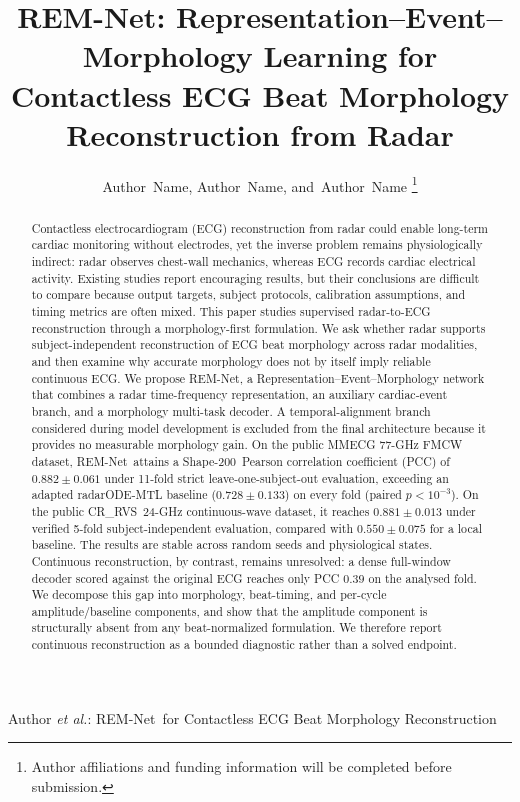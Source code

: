 \documentclass[lettersize,journal]{IEEEtran}
\newcommand{\remnet}{REM-Net\xspace}
\newcommand{\shape}{Shape-200\xspace}
\newcommand{\crrvs}{CR\_RVS\xspace}
\begin{document}
\title{\remnet: Representation--Event--Morphology Learning for Contactless ECG Beat Morphology Reconstruction from Radar}

\author{Author~Name,
        Author~Name,
        and~Author~Name%
\thanks{Author affiliations and funding information will be completed before submission.}
}

%
{Author \MakeLowercase{\textit{et al.}}: \remnet\ for Contactless ECG Beat Morphology Reconstruction}

\maketitle

\begin{abstract}
Contactless electrocardiogram (ECG) reconstruction from radar could enable long-term cardiac monitoring without electrodes, yet the inverse problem remains physiologically indirect: radar observes chest-wall mechanics, whereas ECG records cardiac electrical activity. Existing studies report encouraging results, but their conclusions are difficult to compare because output targets, subject protocols, calibration assumptions, and timing metrics are often mixed. This paper studies supervised radar-to-ECG reconstruction through a morphology-first formulation. We ask whether radar supports subject-independent reconstruction of ECG beat morphology across radar modalities, and then examine why accurate morphology does not by itself imply reliable continuous ECG. We propose \remnet, a Representation--Event--Morphology network that combines a radar time-frequency representation, an auxiliary cardiac-event branch, and a morphology multi-task decoder. A temporal-alignment branch considered during model development is excluded from the final architecture because it provides no measurable morphology gain. On the public MMECG 77-GHz FMCW dataset, \remnet\ attains a \shape\ Pearson correlation coefficient (PCC) of $0.882\pm0.061$ under 11-fold strict leave-one-subject-out evaluation, exceeding an adapted radarODE-MTL baseline ($0.728\pm0.133$) on every fold (paired $p<10^{-3}$). On the public \crrvs\ 24-GHz continuous-wave dataset, it reaches $0.881\pm0.013$ under verified 5-fold subject-independent evaluation, compared with $0.550\pm0.075$ for a local baseline. The results are stable across random seeds and physiological states. Continuous reconstruction, by contrast, remains unresolved: a dense full-window decoder scored against the original ECG reaches only PCC $0.39$ on the analysed fold. We decompose this gap into morphology, beat-timing, and per-cycle amplitude/baseline components, and show that the amplitude component is structurally absent from any beat-normalized formulation. We therefore report continuous reconstruction as a bounded diagnostic rather than a solved endpoint.
\end{abstract}
\end{document}
